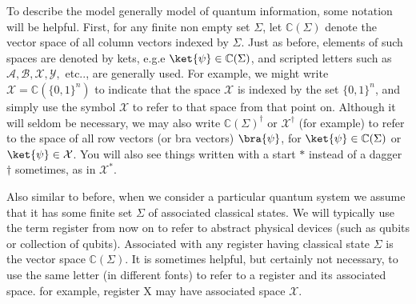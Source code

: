 \documentclass[12pt, oneside]{book}
\theoremstyle{definition}
\theoremstyle{definition}
\theoremstyle{remark}
\begin{document}
To describe the model generally model of quantum information, some notation will be helpful. First, for any finite non empty set $\Sigma$, let $\mathbb{C}(\Sigma)$ denote the vector space of all column vectors indexed by $\Sigma$. Just as before, elements of such spaces are denoted by kets, e.g.e $\ket{\psi} \in \mathbb{C}(\Sigma)$, and scripted letters such as $\mathcal{A},\mathcal{B},\mathcal{X},\mathcal{Y},$ etc.., are generally used. For example, we might write $\mathcal{X}=\mathbb{C}(\{0,1\}^n)$ to indicate that the space $\mathcal{X}$ is indexed by the set $\{0,1\}^n$, and simply use the symbol $\mathcal{X}$ to refer to that space from that point on. Although it will seldom be necessary, we may also write $\mathbb{C}(\Sigma)^{\dagger}$ or $\mathcal{X}^{\dagger}$ (for example) to refer to the space of all row vectors (or bra vectors) $\bra{\psi}$, for $\ket{\psi} \in \mathbb{C}(\Sigma)$ or $\ket{\psi} \in \mathcal{X}$. You will also see things written with a  start $*$ instead of a dagger $\dagger$ sometimes, as in $\mathcal{X}^*$.

Also similar to before, when we consider a particular quantum system we assume that it has some finite set $\Sigma$ of associated classical states. We will typically use the term register from now on to refer to abstract physical devices (such as qubits or collection of qubits). Associated with any register having classical state $\Sigma$ is the vector space $\mathbb{C}(\Sigma)$. It is sometimes helpful, but certainly not necessary, to use the same letter (in different fonts) to refer to a register and its associated space. for example, register X may have associated space $\mathcal{X}$.
\end{document}
